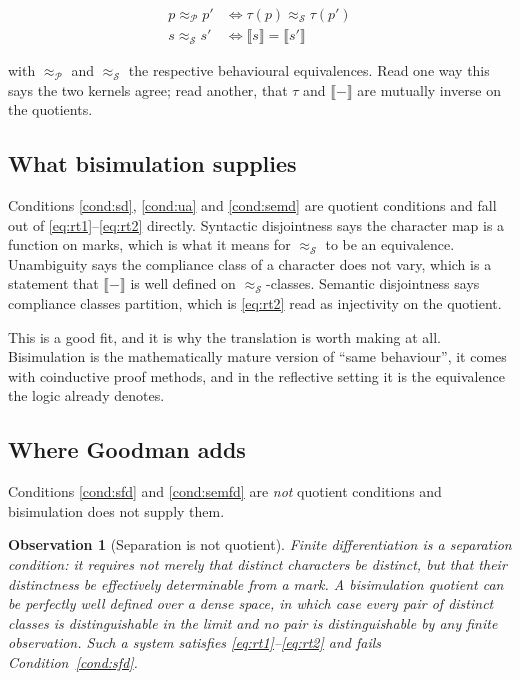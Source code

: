 \documentclass[11pt,a4paper]{article}
\theoremstyle{definition}
\theoremstyle{plain}
\newtheorem{observation}[definition]{Observation}
\theoremstyle{remark}
\newcommand{\bisim}{\approx}
\begin{document}
\begin{align}
p \bisim_{\mathcal{P}} p' &\iff \tau(p) \bisim_{\mathcal{S}} \tau(p') \label{eq:rt1}\\
s \bisim_{\mathcal{S}} s' &\iff \llbracket s \rrbracket = \llbracket s' \rrbracket \label{eq:rt2}
\end{align}

\noindent with $\bisim_{\mathcal{P}}$ and $\bisim_{\mathcal{S}}$ the respective
behavioural equivalences. Read one way this says the two kernels agree; read another, that
$\tau$ and $\llbracket-\rrbracket$ are mutually inverse on the quotients.

\subsection{What bisimulation supplies}

Conditions \ref{cond:sd}, \ref{cond:ua} and \ref{cond:semd} are quotient conditions and
fall out of \eqref{eq:rt1}--\eqref{eq:rt2} directly. Syntactic disjointness says the
character map is a function on marks, which is what it means for $\bisim_{\mathcal{S}}$ to
be an equivalence. Unambiguity says the compliance class of a character does not vary,
which is a statement that $\llbracket-\rrbracket$ is well defined on
$\bisim_{\mathcal{S}}$-classes. Semantic disjointness says compliance classes partition,
which is \eqref{eq:rt2} read as injectivity on the quotient.

This is a good fit, and it is why the translation is worth making at all. Bisimulation is
the mathematically mature version of ``same behaviour'', it comes with coinductive proof
methods, and in the reflective setting it is the equivalence the logic already denotes.

\subsection{Where Goodman adds}
\label{sec:adds}

Conditions \ref{cond:sfd} and \ref{cond:semfd} are \emph{not} quotient conditions and
bisimulation does not supply them.

\begin{observation}[Separation is not quotient]
\label{obs:sep}
Finite differentiation is a separation condition: it requires not merely that distinct
characters be distinct, but that their distinctness be \emph{effectively determinable}
from a mark. A bisimulation quotient can be perfectly well defined over a dense space,
in which case every pair of distinct classes is distinguishable in the limit and no pair
is distinguishable by any finite observation. Such a system satisfies
\eqref{eq:rt1}--\eqref{eq:rt2} and fails Condition~\ref{cond:sfd}.
\end{observation}
\end{document}
